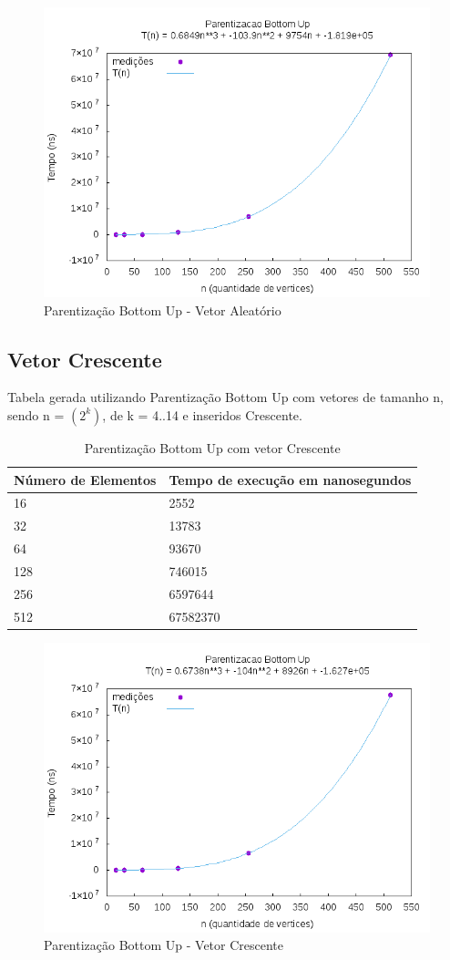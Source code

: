 \documentclass[12pt,a4paper,twoside]{report}
\begin{document}
\begin{figure}[H]
    \centering
    \includegraphics[width=0.7\linewidth]{graficos/Parentizacao BottomUp/Aleatorio/ParentizacaoBottomUp.png}
  \caption{Parentização Bottom Up - Vetor Aleatório}
\end{figure}



\subsection{Vetor Crescente}
Tabela gerada utilizando Parentização Bottom Up com vetores de tamanho n, sendo n = $(2^k)$, de k = 4..14 e inseridos Crescente.
\begin{table}[H]
\centering
\caption{Parentização Bottom Up com vetor Crescente}
\label{my-label}
\begin{tabular}{|l|l|}
\hline
\multicolumn{1}{|c|}{\textbf{Número de Elementos}} & \multicolumn{1}{c|}{\textbf{Tempo de execução em nanosegundos}} \\ \hline
16 & 2552 \\ \hline
32 & 13783 \\ \hline
64 & 93670 \\ \hline
128 & 746015 \\ \hline
256 & 6597644 \\ \hline
512 & 67582370 \\ \hline
\end{tabular}
\end{table}

\begin{figure}[H]
    \centering
    \includegraphics[width=0.7\linewidth]{graficos/Parentizacao BottomUp/Crescente/ParentizacaoBottomUp.png}
  \caption{Parentização Bottom Up - Vetor Crescente}
\end{figure}
\end{document}
